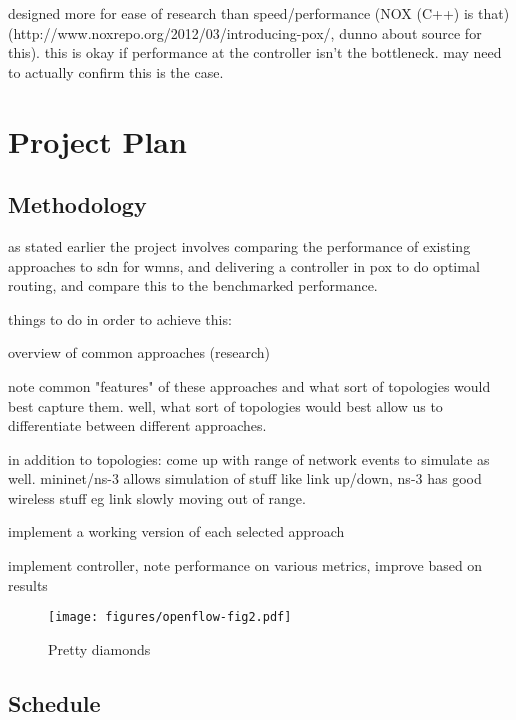 \documentclass[pdftex,12pt,a4paper]{article}
\begin{document}
designed more for ease of research than speed/performance (NOX (C++) is that) (http://www.noxrepo.org/2012/03/introducing-pox/, dunno about source for this). this is okay if performance at the controller isn't the bottleneck. may need to actually confirm this is the case.

\newpage
\section{Project Plan}
\subsection{Methodology}

as stated earlier the project involves comparing the performance of existing approaches to sdn for wmns, and delivering a controller in pox to do optimal routing, and compare this to the benchmarked performance.

things to do in order to achieve this:

overview of common approaches (research)

note common "features" of these approaches and what sort of topologies would best capture them. well, what sort of topologies would best allow us to differentiate between different approaches.

in addition to topologies: come up with range of network events to simulate as well. mininet/ns-3 allows simulation of stuff like link up/down, ns-3 has good wireless stuff eg link slowly moving out of range.

implement a working version of each selected approach

implement controller, note performance on various metrics, improve based on results

\begin{figure}
	\begin{center}
		\texttt{[image: figures/openflow-fig2.pdf]}
		\caption{Pretty diamonds}
	\end{center}
\end{figure}

\subsection{Schedule}
\end{document}
